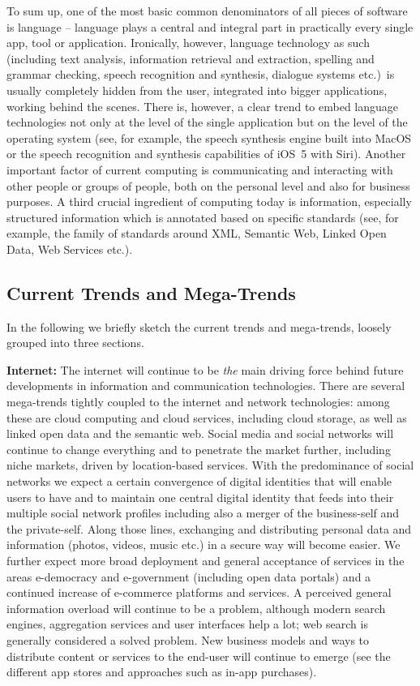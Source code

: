 \documentclass[10pt, plain]{../../metanetpaper}
\begin{document}
\begin{multicols}{2}
To sum up, one of the most basic common denominators of all pieces of software is language -- language plays a central and integral part in practically every single app, tool or application. Ironically, however, language technology as such (including text analysis, information retrieval and extraction, spelling and grammar checking, speech recognition and synthesis, dialogue systems etc.)~is usually completely hidden from the user, integrated into bigger applications, working behind the scenes. There is, however, a clear trend to embed language technologies not only at the level of the single application but on the level of the operating system (see, for example, the speech synthesis engine built into MacOS or the speech recognition and synthesis capabilities of iOS~5 with Siri). Another important factor of current computing is communicating and interacting with other people or groups of people, both on the personal level and also for business purposes.  A third crucial ingredient of computing today is information, especially structured information which is annotated based on specific standards (see, for example, the family of standards around XML, Semantic Web, Linked Open Data, Web Services etc.).

\subsection{Current Trends and Mega-Trends}
\label{sec:major-trends}

In the following we briefly sketch the current trends and mega-trends, loosely grouped into three sections.

\textbf{Internet:} The internet will continue to be \emph{the} main driving force behind future developments in information and communication technologies. There are several mega-trends tightly coupled to the internet and network technologies: among these are cloud computing and cloud services, including cloud storage, as well as linked open data and the semantic web. Social media and social networks will continue to change everything and to penetrate the market further, including niche markets, driven by location-based services. With the predominance of social networks we expect a certain convergence of digital identities that will enable users to have and to maintain one central digital identity that feeds into their multiple social network profiles including also a merger of the business-self and the private-self. Along those lines, exchanging and distributing personal data and information (photos, videos, music etc.) in a secure way will become easier. We further expect more broad deployment and general acceptance of services in the areas e-democracy and e-government (including open data portals) and a continued increase of e-commerce platforms and services. A perceived general information overload will continue to be a problem, although modern search engines, aggregation services and user interfaces help a lot; web search is generally considered a solved problem. New business models and ways to distribute content or services to the end-user will continue to emerge (see the different app stores and approaches such as in-app purchases).


\end{multicols}
\end{document}
